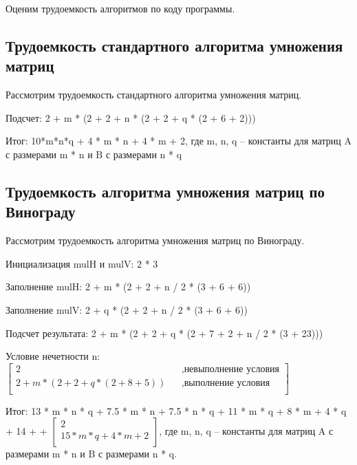 \documentclass[12pt]{report}
\begin{document}
Оценим трудоемкость алгоритмов по коду программы.

\subsection{Трудоемкость стандартного алгоритма умножения матриц}
Рассмотрим трудоемкость стандартного алгоритма умножения матриц.\vspace{\baselineskip}

Подсчет: 2 + m * (2 + 2 + n * (2 + 2 + q * (2 + 6 + 2)))\vspace{\baselineskip}

Итог: 10*m*n*q + 4 * m * n + 4 * m + 2, где m, n, q – константы для матриц A с размерами m * n и B с размерами n * q 

\subsection{Трудоемкость алгоритма умножения матриц по Винограду}
Рассмотрим трудоемкость алгоритма умножения матриц по Винограду.\vspace{\baselineskip}

Инициализация mulH и mulV: 2 * 3\vspace{\baselineskip}

Заполнение mulH: 2 + m * (2 + 2 + n / 2 * (3 + 6 + 6))\vspace{\baselineskip}

Заполнение mulV: 2 + q * (2 + 2 + n / 2 * (3 + 6 + 6))\vspace{\baselineskip}

Подсчет результата: 2 + m * (2 + 2 + q * (2 + 7 + 2 + n / 2 * (3 + 23)))\vspace{\baselineskip}


Условие нечетности n: $\begin{bmatrix}
	2    &&, \text{невыполнение условия}\\
	2 + m *(2 + 2 + q * (2 + 8 + 5)) &&, \text{выполнение условия}\\
\end{bmatrix} $ \\
\vspace{\baselineskip}

Итог: 13 * m * n * q + 7.5 * m * n + 7.5 * n * q + 11 * m * q + 8 * m + 4 * q + 14 + + $\begin{bmatrix}
	2    \\
	15*m*q + 4*m + 2\\
\end{bmatrix} $, где m, n, q – константы для матриц A с размерами m * n и B с размерами n * q.
\end{document}

